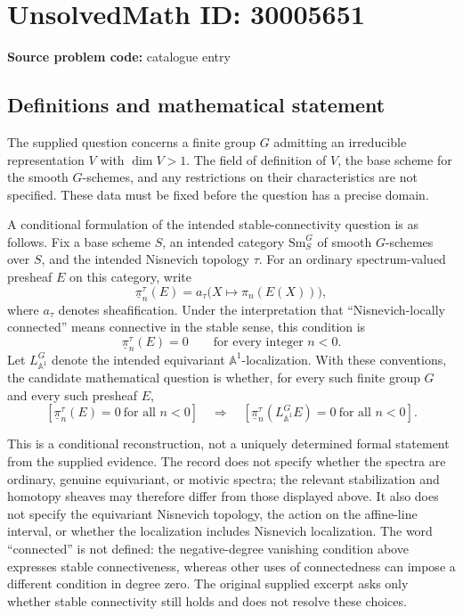 \documentclass[11pt]{article}
\begin{document}
\section*{UnsolvedMath ID: 30005651}
\textbf{Source problem code:} catalogue entry
\subsection{Definitions and mathematical statement}
The supplied question concerns a finite group \(G\) admitting an irreducible representation \(V\) with \(\dim V>1\). The field of definition of \(V\), the base scheme for the smooth \(G\)-schemes, and any restrictions on their characteristics are not specified. These data must be fixed before the question has a precise domain.

A conditional formulation of the intended stable-connectivity question is as follows. Fix a base scheme \(S\), an intended category \(\mathrm{Sm}^{G}_{S}\) of smooth \(G\)-schemes over \(S\), and the intended Nisnevich topology \(\tau\). For an ordinary spectrum-valued presheaf \(E\) on this category, write
\[
\underline{\pi}^{\tau}_{n}(E)=a_{\tau}\bigl(X\longmapsto\pi_n(E(X))\bigr),
\]
where \(a_{\tau}\) denotes sheafification. Under the interpretation that ``Nisnevich-locally connected'' means connective in the stable sense, this condition is
\[
\underline{\pi}^{\tau}_{n}(E)=0\qquad\text{for every integer }n<0.
\]
Let \(L^{G}_{\mathbb A^{1}}\) denote the intended equivariant \(\mathbb A^{1}\)-localization. With these conventions, the candidate mathematical question is whether, for every such finite group \(G\) and every such presheaf \(E\),
\[
\left[\underline{\pi}^{\tau}_{n}(E)=0\ \text{for all }n<0\right]
\quad\Longrightarrow\quad
\left[\underline{\pi}^{\tau}_{n}\!\left(L^{G}_{\mathbb A^{1}}E\right)=0\ \text{for all }n<0\right].
\]

This is a conditional reconstruction, not a uniquely determined formal statement from the supplied evidence. The record does not specify whether the spectra are ordinary, genuine equivariant, or motivic spectra; the relevant stabilization and homotopy sheaves may therefore differ from those displayed above. It also does not specify the equivariant Nisnevich topology, the action on the affine-line interval, or whether the localization includes Nisnevich localization. The word ``connected'' is not defined: the negative-degree vanishing condition above expresses stable connectiveness, whereas other uses of connectedness can impose a different condition in degree zero. The original supplied excerpt asks only whether stable connectivity still holds and does not resolve these choices.
\end{document}
